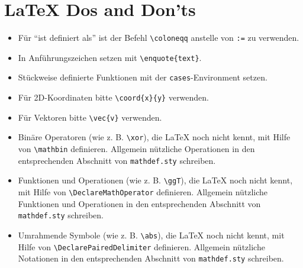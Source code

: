\documentclass{article}
\begin{document}
\section*{\LaTeX{} Dos and Don'ts}
\begin{itemize}[leftmargin=.5cm]
    \item Für \enquote{ist definiert als} ist der Befehl \texttt{\textbackslash coloneqq} anstelle von \texttt{:=} zu verwenden.
    \item In Anführungszeichen setzen mit \texttt{\textbackslash enquote\{text\}}.
    \item Stückweise definierte Funktionen mit der \texttt{cases}-Environment setzen.
    \item Für 2D-Koordinaten bitte \texttt{\textbackslash coord\{x\}\{y\}} verwenden.
    \item Für Vektoren bitte \texttt{\textbackslash vec\{v\}} verwenden.
    \item Binäre Operatoren (wie z. B. \texttt{\textbackslash xor}), die \LaTeX{} noch nicht kennt, mit Hilfe von \texttt{\textbackslash mathbin} definieren. Allgemein nützliche Operationen in den entsprechenden Abschnitt von \texttt{mathdef.sty} schreiben.
    \item Funktionen und Operationen (wie z. B. \texttt{\textbackslash ggT}), die \LaTeX{} noch nicht kennt, mit Hilfe von \texttt{\textbackslash DeclareMathOperator} definieren. Allgemein nützliche Funktionen und Operationen in den entsprechenden Abschnitt von \texttt{mathdef.sty} schreiben.
    \item Umrahmende Symbole (wie z. B. \texttt{\textbackslash abs}), die \LaTeX{} noch nicht kennt, mit Hilfe von \texttt{\textbackslash DeclarePairedDelimiter} definieren. Allgemein nützliche Notationen in den entsprechenden Abschnitt von \texttt{mathdef.sty} schreiben.
\end{itemize}
\end{document}
